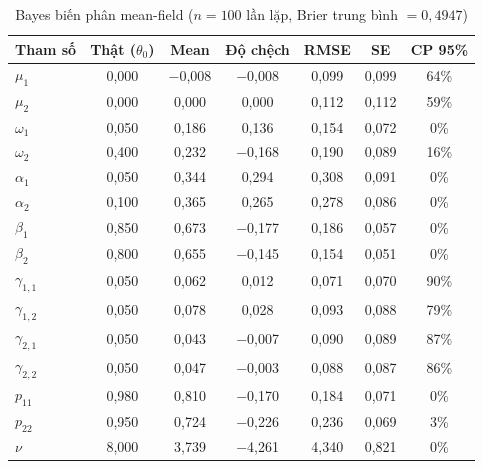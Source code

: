 \documentclass[11pt,a4paper]{article}
\begin{document}
\begin{table}[H]\centering\footnotesize
\caption{Bayes biến phân mean-field ($n=100$ lần lặp, Brier trung bình $=0,4947$)}
\begin{tabularx}{\textwidth}{l C C C C C C}
\toprule
\textbf{Tham số} & \textbf{Thật ($\theta_0$)} & \textbf{Mean} & \textbf{Độ chệch} & \textbf{RMSE} & \textbf{SE} & \textbf{CP 95\%} \\
\midrule
$\mu_1$ & 0,000 & $-$0,008 & $-$0,008 & 0,099 & 0,099 & 64\% \\
$\mu_2$ & 0,000 & 0,000 & 0,000 & 0,112 & 0,112 & 59\% \\
$\omega_1$ & 0,050 & 0,186 & 0,136 & 0,154 & 0,072 & 0\% \\
$\omega_2$ & 0,400 & 0,232 & $-$0,168 & 0,190 & 0,089 & 16\% \\
$\alpha_1$ & 0,050 & 0,344 & 0,294 & 0,308 & 0,091 & 0\% \\
$\alpha_2$ & 0,100 & 0,365 & 0,265 & 0,278 & 0,086 & 0\% \\
$\beta_1$ & 0,850 & 0,673 & $-$0,177 & 0,186 & 0,057 & 0\% \\
$\beta_2$ & 0,800 & 0,655 & $-$0,145 & 0,154 & 0,051 & 0\% \\
$\gamma_{1,1}$ & 0,050 & 0,062 & 0,012 & 0,071 & 0,070 & 90\% \\
$\gamma_{1,2}$ & 0,050 & 0,078 & 0,028 & 0,093 & 0,088 & 79\% \\
$\gamma_{2,1}$ & 0,050 & 0,043 & $-$0,007 & 0,090 & 0,089 & 87\% \\
$\gamma_{2,2}$ & 0,050 & 0,047 & $-$0,003 & 0,088 & 0,087 & 86\% \\
$p_{11}$ & 0,980 & 0,810 & $-$0,170 & 0,184 & 0,071 & 0\% \\
$p_{22}$ & 0,950 & 0,724 & $-$0,226 & 0,236 & 0,069 & 3\% \\
$\nu$ & 8,000 & 3,739 & $-$4,261 & 4,340 & 0,821 & 0\% \\
\bottomrule
\end{tabularx}
\end{table}
\end{document}
